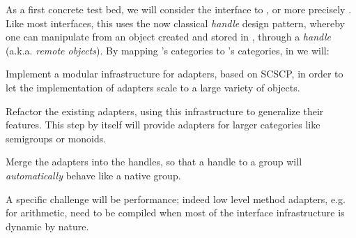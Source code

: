 \begin{workpackage}[id=component-architecture,wphases=0-48!.5,
  title=Component Architecture,lead=UV,
  PSRM=24,UVRM=8,SARM=16, USHRM=4]
\begin{tasklist}
\begin{task}[title=Interfaces between systems,id=interface-systems,lead=PS,PM=18]
    As a first concrete test bed, we will consider the \Sage interface
    to \GAP, or more precisely \libGAP.  Like most \Sage interfaces,
    this uses the now classical \emph{handle} design pattern, whereby
    one can manipulate from \Sage an object created and stored in
    \GAP, through a \emph{handle} (a.k.a. \emph{remote objects}).  By
    mapping \GAP's categories to \Sage's categories, in
     we
    will:
    \begin{compactitem}
    \item Implement a modular infrastructure for adapters, based on
      SCSCP, in order to let the implementation of adapters scale to a
      large variety of objects.
    \item Refactor the existing adapters, using this infrastructure to
      generalize their features. This step by itself will provide
      adapters for larger categories like semigroups or monoids.
    \item Merge the adapters into the handles, so that a handle to a
      \GAP group will \emph{automatically} behave like a native \Sage
      group.
    \end{compactitem}
    A specific challenge will be performance; indeed low level method
    adapters, e.g. for arithmetic, need to be compiled when most of
    the interface infrastructure is dynamic by nature.


  \end{task}

  \begin{task}[title=Modularization and packaging,id=mod-packaging,lead=UV,PM=32]



\end{task}
\end{tasklist}
\end{workpackage}
